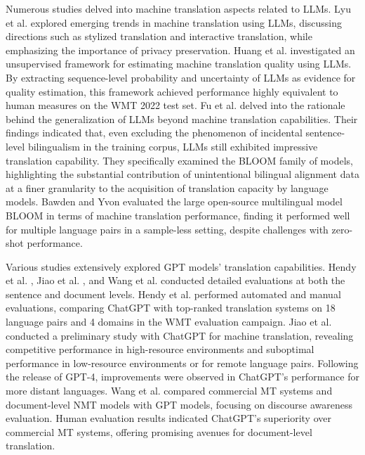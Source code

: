 \documentclass[acmsmall]{acmart}
\begin{document}
Numerous studies delved into machine translation aspects related to LLMs. Lyu et al. \cite{DBLP:journals/corr/abs-2305-01181} explored emerging trends in machine translation using LLMs, discussing directions such as stylized translation and interactive translation, while emphasizing the importance of privacy preservation. Huang et al. \cite{DBLP:conf/nlpcc/HuangWLWSWYZ23} investigated an unsupervised framework for estimating machine translation quality using LLMs. By extracting sequence-level probability and uncertainty of LLMs as evidence for quality estimation, this framework achieved performance highly equivalent to human measures on the WMT 2022 test set. Fu et al. \cite{fu2024reasonableness} delved into the rationale behind the generalization of LLMs beyond machine translation capabilities. Their findings indicated that, even excluding the phenomenon of incidental sentence-level bilingualism in the training corpus, LLMs still exhibited impressive translation capability. They specifically examined the BLOOM family of models, highlighting the substantial contribution of unintentional bilingual alignment data at a finer granularity to the acquisition of translation capacity by language models. Bawden and Yvon \cite{DBLP:conf/eamt/BawdenY23} evaluated the large open-source multilingual model BLOOM in terms of machine translation performance, finding it performed well for multiple language pairs in a sample-less setting, despite challenges with zero-shot performance.

Various studies extensively explored GPT models' translation capabilities. Hendy et al. \cite{Amr}, Jiao et al. \cite{Wenxiang}, and Wang et al. \cite{Longyue} conducted detailed evaluations at both the sentence and document levels. Hendy et al. performed automated and manual evaluations, comparing ChatGPT with top-ranked translation systems on 18 language pairs and 4 domains in the WMT evaluation campaign. Jiao et al. conducted a preliminary study with ChatGPT for machine translation, revealing competitive performance in high-resource environments and suboptimal performance in low-resource environments or for remote language pairs. Following the release of GPT-4, improvements were observed in ChatGPT's performance for more distant languages. Wang et al. compared commercial MT systems and document-level NMT models with GPT models, focusing on discourse awareness evaluation. Human evaluation results indicated ChatGPT's superiority over commercial MT systems, offering promising avenues for document-level translation.
\end{document}
